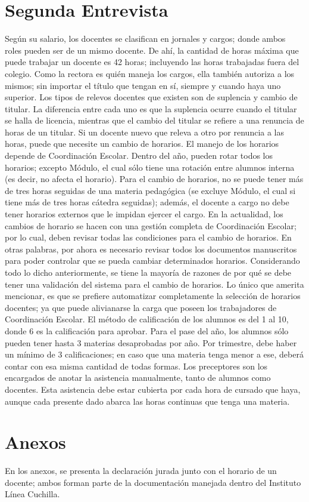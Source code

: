 \section{Segunda Entrevista}
\normalsize{ \indent
Según su salario, los docentes se clasifican en jornales y
cargos; donde ambos roles pueden ser de un mismo docente.
De ahí, la cantidad de horas máxima que puede trabajar un
docente es 42 horas; incluyendo las horas trabajadas fuera
del colegio. Como la rectora es quién maneja los cargos,
ella también autoriza a los mismos; sin importar el título
que tengan en sí, siempre y cuando haya uno superior.
}
\newline
\normalsize{ \indent
Los tipos de relevos docentes que existen son de suplencia
y cambio de titular. La diferencia entre cada uno es que la
suplencia ocurre cuando el titular se halla de licencia,
mientras que el cambio del titular se refiere a una renuncia
de horas de un titular. Si un docente nuevo que releva a otro
por renuncia a las horas, puede que necesite un cambio de
horarios.
}
\newline
\normalsize{ \indent
El manejo de los horarios depende de Coordinación Escolar.
Dentro del año, pueden rotar todos los horarios; excepto
Módulo, el cual sólo tiene una rotación entre alumnos interna
(es decir, no afecta el horario). Para el cambio de horarios,
no se puede tener más de tres horas seguidas de una materia
pedagógica (se excluye Módulo, el cual si tiene más de tres
horas cátedra seguidas); además, el docente a cargo no debe
tener horarios externos que le impidan ejercer el cargo.
}
\newline
\normalsize{ \indent
En la actualidad, los cambios de horario se hacen con una
gestión completa de Coordinación Escolar; por lo cual, deben
revisar todas las condiciones para el cambio de horarios.
En otras palabras, por ahora es necesario revisar todos los
documentos manuscritos para poder controlar que se pueda
cambiar determinados horarios.
}
\newline
\normalsize{ \indent
Considerando todo lo dicho anteriormente, se tiene la mayoría
de razones de por qué se debe tener una validación del sistema
para el cambio de horarios. Lo único que amerita mencionar, es
que se prefiere automatizar completamente la selección de horarios
docentes; ya que puede alivianarse la carga que poseen los
trabajadores de Coordinación Escolar.
}
\newline
\normalsize{ \indent
El método de calificación de los alumnos es del 1 al 10, donde 6 es
la calificación para aprobar. Para el pase del año, los alumnos sólo
pueden tener hasta 3 materias desaprobadas por año. Por trimestre, debe
haber un mínimo de 3 calificaciones; en caso que una materia tenga menor
a ese, deberá contar con esa misma cantidad de todas formas.
}
\newline
\normalsize{ \indent
Los preceptores son los encargados de anotar la asistencia manualmente,
tanto de alumnos como docentes. Esta asistencia debe estar cubierta por
cada hora de cursado que haya, aunque cada presente dado abarca las horas
continuas que tenga una materia.
}
\section{Anexos}
\normalsize{ \indent
En los anexos, se presenta la declaración jurada junto con el
horario de un docente; ambos forman parte de la documentación
manejada dentro del Instituto Línea Cuchilla.
}
